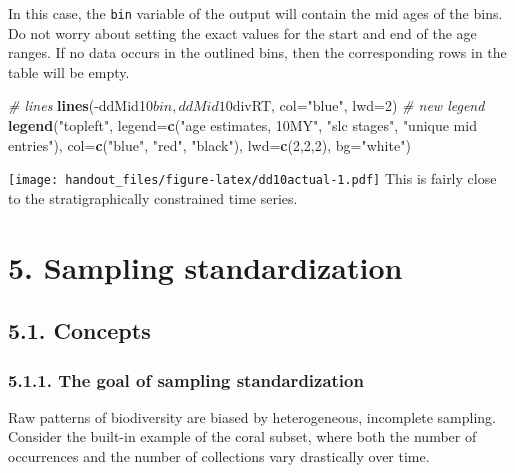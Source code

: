 \documentclass[]{article}
\newenvironment{Shaded}{\begin{snugshade}}{\end{snugshade}}
\newcommand{\KeywordTok}[1]{\textcolor[rgb]{0.13,0.29,0.53}{\textbf{{#1}}}}
\newcommand{\DataTypeTok}[1]{\textcolor[rgb]{0.13,0.29,0.53}{{#1}}}
\newcommand{\DecValTok}[1]{\textcolor[rgb]{0.00,0.00,0.81}{{#1}}}
\newcommand{\StringTok}[1]{\textcolor[rgb]{0.31,0.60,0.02}{{#1}}}
\newcommand{\CommentTok}[1]{\textcolor[rgb]{0.56,0.35,0.01}{\textit{{#1}}}}
\newcommand{\NormalTok}[1]{{#1}}
\begin{document}
In this case, the \texttt{bin} variable of the output will contain the
mid ages of the bins. Do not worry about setting the exact values for
the start and end of the age ranges. If no data occurs in the outlined
bins, then the corresponding rows in the table will be empty.

\begin{Shaded}
\begin{Highlighting}[]
\CommentTok{# lines  }
\KeywordTok{lines}\NormalTok{(-ddMid10$bin, ddMid10$divRT, }\DataTypeTok{col=}\StringTok{"blue"}\NormalTok{, }\DataTypeTok{lwd=}\DecValTok{2}\NormalTok{)}
\CommentTok{# new legend}
\KeywordTok{legend}\NormalTok{(}\StringTok{"topleft"}\NormalTok{, }\DataTypeTok{legend=}\KeywordTok{c}\NormalTok{(}\StringTok{"age estimates, 10MY"}\NormalTok{,  }
  \StringTok{"slc stages"}\NormalTok{, }\StringTok{"unique mid entries"}\NormalTok{), }\DataTypeTok{col=}\KeywordTok{c}\NormalTok{(}\StringTok{"blue"}\NormalTok{, }\StringTok{"red"}\NormalTok{, }\StringTok{"black"}\NormalTok{),}
  \DataTypeTok{lwd=}\KeywordTok{c}\NormalTok{(}\DecValTok{2}\NormalTok{,}\DecValTok{2}\NormalTok{,}\DecValTok{2}\NormalTok{), }\DataTypeTok{bg=}\StringTok{"white"}\NormalTok{)}
\end{Highlighting}
\end{Shaded}

\texttt{[image: handout\_files/figure-latex/dd10actual-1.pdf]} This is
fairly close to the stratigraphically constrained time series.

\section{5. Sampling standardization}\label{sampling-standardization}

\subsection{5.1. Concepts}\label{concepts}

\subsubsection{5.1.1. The goal of sampling
standardization}\label{the-goal-of-sampling-standardization}

Raw patterns of biodiversity are biased by heterogeneous, incomplete
sampling. Consider the built-in example of the coral subset, where both
the number of occurrences and the number of collections vary drastically
over time.
\end{document}
